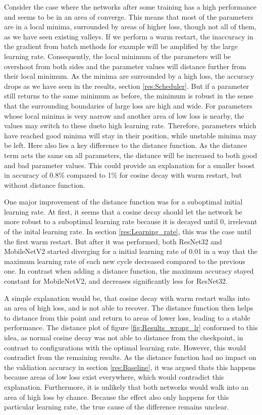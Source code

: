 Consider the case where the networks after some training has a high performance
and seems to be in an area of converge. This means that most of the parameters
are in a local minima, surrounded by areas of higher loss, though not all of
them, as we have seen existing valleys. If we perform a warm restart, the
inaccuracy in the gradient from batch methods for example will be amplified by
the large learning rate. Consequently, the local minimum of the parameters will
be overshoot from both sides and the parameter values will distance further from
their local minimum. As the minima are surrounded by a high loss, the accuracy
drops as we have seen in the results, section \ref{res:Scheduler}. But if a
parameter still returns to the same minimum as before, the minimum is robust in
the sense that the surrounding boundaries of large loss are high and wide. For
parameters whose local minima is very narrow and another area of low loss is
nearby, the values may switch to these dueto high learning rate. Therefore,
parameters which have reached good minima will stay in their position, while
unstable minima may be left. Here also lies a key difference to the distance
function. As the distance term acts the same on all parameters, the distance
will be increased to both good and bad parameter values. This could provide an
explanation for a smaller boost in accuracy of 0.8\% compared to 1\% for cosine
decay with warm restart, but without distance function.
\newline

One major improvement of the distance function was for a suboptimal initial learning
rate. At first, it seems that a cosine decay should let the network be more
robust to a suboptimal learning rate because it is decayed until 0, irrelevant of the
inital learning rate. In section \ref{res:Learning_rate}, this was the case
until the first warm restart. But after it was performed, both ResNet32 and
MobileNetV2 started diverging for a initial learning rate of 0.01 in a way that
the maximum learning rate of each new cycle decreased compared to the previous
one. In contrast when adding a distance function, the maximum accuracy stayed
constant for MobileNetV2, and decreases significantly less for ResNet32.

A simple explanation would be, that cosine decay with warm restart walks into an
area of high loss, and is not able to recover. The distance function then helps
to distance from this point and return to areas of lower loss, leading to a
stable performance. The distance plot of figure \ref{fig:Results_wrong_lr}
conformed to this idea, as normal cosine decay was not able to distance from the
checkpoint, in contrast to configurations with the optimal learning rate.
However, this would contradict from the remaining results. As the distance
function had no impact on the valdiation accuracy in section \ref{res:Baseline},
it was argued thats this happens because areas of low loss exist everywhere,
which would contradict this explanation. Furthermore, it is unlikely that both
networks would walk into an area of high loss by chance. Because the effect also
only happens for this particular learning rate, the true cause of the difference
remains unclear.
\newline

